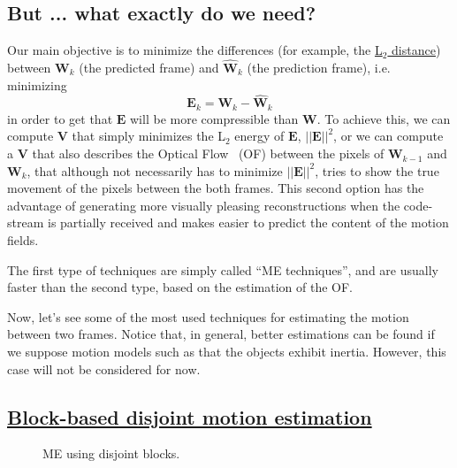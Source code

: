 \subsection{But ... what exactly do we need?}
Our main objective is to minimize the differences (for example, the
\href{https://en.wikipedia.org/wiki/Euclidean_distance}{L$_2$
  distance}) between ${\mathbf W}_k$ (the predicted frame) and $\hat{\mathbf W}_k$ (the
prediction frame), i.e. minimizing
\begin{equation}
  {\mathbf E}_k = {\mathbf W}_k - \hat{\mathbf W}_k
\end{equation}
in order to get that ${\mathbf E}$ will be more compressible than
${\mathbf W}$. To achieve this, we can compute ${\mathbf V}$ that
simply minimizes the L$_2$ energy of ${\mathbf E}$, $||{\mathbf
  E}||^2$, or we can compute a ${\mathbf V}$ that also describes the
Optical Flow~\cite{horn1981determining} (OF) between the pixels of
${\mathbf W}_{k-1}$ and ${\mathbf W}_k$, that although not necessarily
has to minimize $||{\mathbf E}||^2$, tries to show the true movement
of the pixels between the both frames. This second option has the
advantage of generating more visually pleasing reconstructions when
the code-stream is partially received and makes easier to predict the
content of the motion fields.

The first type of techniques are simply called ``ME techniques'', and
are usually faster than the second type, based on the estimation of
the OF.


Now, let's see some of the most used techniques for estimating the
motion between two frames. Notice that, in general, better estimations
can be found if we suppose motion models such as that the objects
exhibit inertia. However, this case will not be considered for now.

\subsection{\href{https://vicente-gonzalez-ruiz.github.io/video_compression/\#x1-40003}{Block-based disjoint motion estimation}}

\begin{figure}
  \centering
  \caption{ME using disjoint blocks.}
  \label{fig:simple}
\end{figure}

